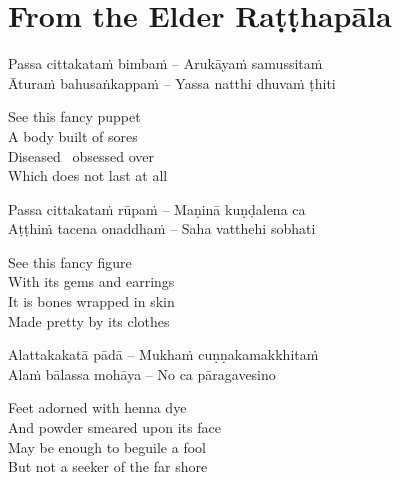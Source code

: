 \section{From the Elder Raṭṭhapāla}
\label{ratthapala}

\begin{leader}
\end{leader}

\begin{twochants}
  Passa cittakataṁ bimbaṁ – Arukāyaṁ samussitaṁ\\
  Āturaṁ bahusaṅkappaṁ – Yassa natthi dhuvaṁ ṭhiti\\
\end{twochants}

\begin{english}
  See this fancy puppet\\
  A body built of sores\\
  Diseased \breathmark\ obsessed over\\
  Which does not last at all
\end{english}

\begin{twochants}
  Passa cittakataṁ rūpaṁ – Maṇinā kuṇḍalena ca\\
  Aṭṭhiṁ tacena onaddhaṁ – Saha vatthehi sobhati\\
\end{twochants}

\begin{english}
  See this fancy figure\\
  With its gems and earrings\\
  It is bones wrapped in skin\\
  Made pretty by its clothes
\end{english}

\begin{twochants}
  Alattakakatā pādā – Mukhaṁ cuṇṇakamakkhitaṁ\\
  Alaṁ bālassa mohāya – No ca pāragavesino\\
\end{twochants}

\begin{english}
  Feet adorned with henna dye\\
  And powder smeared upon its face\\
  May be enough to beguile a fool\\
  But not a seeker of the far shore
\end{english}

